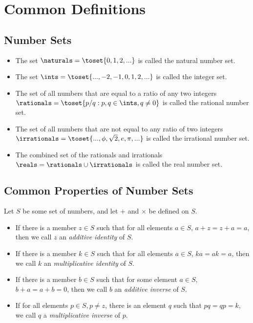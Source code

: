 \section{Common Definitions}
\subsection{Number Sets}{\label{subsec: defnumbersets}}
\begin{itemize}
  \item The set $\naturals = \toset{0, 1, 2, ...}$ is called the natural
  number set.
  \item The set $\ints = \toset{ ..., -2, -1, 0, 1, 2, ... }$ is called
  the integer set.
  \item The set of all numbers that are equal to a ratio of any two
  integers $\rationals = \toset{p/q : p, q \in \ints, q \neq 0}$ is called
  the rational number set.
  \item The set of all numbers that are not equal to any ratio of two
  integers $\irrationals = \toset{..., \phi, \sqrt{2}, e, \pi, ...}$ is
  called the irrational number set.
  \item The combined set of the rationals and irrationals
  $\reals = \rationals \cup \irrationals$ is called the real number set.
\end{itemize}

\subsection{Common Properties of Number Sets}
Let $S$ be some set of numbers, and let $+$ and $\times$ be defined on $S$.
\begin{itemize}
  \item If there is a member $z \in S$ such that for all elements 
  $a \in S$, $a + z = z + a = a$, then we call $z$ an \emph{additive identity} of
  $S$.
  
  \item If there is a member $k \in S$ such that for all elements $a \in S$,
  $ka = ak = a$, then we call $k$ an \emph{multiplicative identity} of $S$.

  \item If there is a member $b \in S$ such that for some element
  $a \in S$, $b + a = a + b = 0$, then we call $b$ an \emph{additive inverse}
  of $S$.

  \item If for all elements $p \in S, p \neq z$, there is an element $q$ such
  that $pq = qp = k$, we call $q$ a \emph{multiplicative inverse} of $p$.
\end{itemize}

